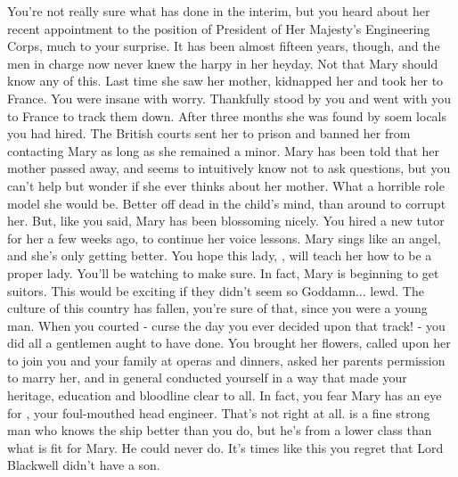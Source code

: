 \documentclass[char]{airship}
\begin{document}
You're not really sure what \cCurie{} has done in the interim, but you
heard about her recent appointment to the position of President of Her
Majesty's Engineering Corps, much to your surprise. It has been almost
fifteen years, though, and the men in charge now never knew the harpy
in her heyday. Not that Mary should know any of this. Last time she
saw her mother, \cCurie{} kidnapped her and took her to France. You
were insane with worry. Thankfully \cBoddy{} stood by you and went
with you to France to track them down. After three months she was
found by soem locals you had hired. The British courts sent her to
prison and banned her from contacting Mary as long as she remained a
minor. Mary has been told that her mother passed away, and seems to
intuitively know not to ask questions, but you can't help but wonder
if she ever thinks about her mother. What a horrible role model she
would be. Better off dead in the child's mind, than around to corrupt
her. But, like you said, Mary has been blossoming nicely. You hired a
new tutor for her a few weeks ago, to continue her voice lessons. Mary
sings like an angel, and she's only getting better. You hope this
lady, \cWhore{\intro}, will teach her how to be a proper lady. You'll
be watching to make sure. In fact, Mary is beginning to get
suitors. This would be exciting if they didn't seem so
Goddamn... lewd. The culture of this country has fallen, you're sure
of that, since you were a young man. When you courted \cCurie{} -
curse the day you ever decided upon that track! - you did all a
gentlemen aught to have done. You brought her flowers, called upon her
to join you and your family at operas and dinners, asked her parents
permission to marry her, and in general conducted yourself in a way
that made your heritage, education and bloodline clear to all. In
fact, you fear Mary has an eye for \cCid{}, your foul-mouthed head
engineer. That's not right at all. \cCid{} is a fine strong man who
knows the ship better than you do, but he's from a lower class than
what is fit for Mary. He could never do. It's times like this you
regret that Lord Blackwell didn't have a son.
\end{document}
